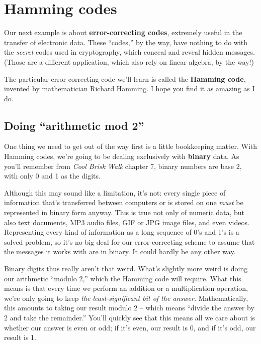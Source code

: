 \vfill

\pagebreak

\renewcommand{\thesubsection}{H\arabic{subsection}.}%
\section{Hamming codes}


Our next example is about \textbf{error-correcting codes}, extremely useful in
the transfer of electronic data. These ``codes,'' by the way, have nothing to
do with the \textit{secret} codes used in cryptography, which conceal and
reveal hidden messages. (Those are a different application, which also rely on
linear algebra, by the way!)

The particular error-correcting code we'll learn is called the \textbf{Hamming
code}, invented by mathematician Richard Hamming. I hope you find it as amazing
as I do.

\subsection{Doing ``arithmetic mod 2''}


One thing we need to get out of the way first is a little bookkeeping matter.
With Hamming codes, we're going to be dealing exclusively with \textbf{binary}
data. As you'll remember from \textit{Cool Brisk Walk} chapter 7, binary
numbers are base 2, with only 0 and 1 as the digits.


Although this may sound like a limitation, it's not: every single piece of
information that's transferred between computers or is stored on one
\textit{must} be represented in binary form anyway. This is true not only of
numeric data, but also text documents, MP3 audio files, GIF or JPG image files,
and even videos. Representing every kind of information as a long sequence of
0's and 1's is a solved problem, so it's no big deal for our error-correcting
scheme to assume that the messages it works with are in binary. It could hardly
be any other way.


Binary digits thus really aren't that weird. What's slightly more weird is
doing our arithmetic ``modulo 2,'' which the Hamming code will require. What
this means is that every time we perform an addition or a multiplication
operation, we're only going to keep \textit{the least-significant bit of the
answer.} Mathematically, this amounts to taking our result modulo 2 -- which
means ``divide the answer by 2 and take the remainder.'' You'll quickly see
that this means all we care about is whether our answer is even or odd; if it's
even, our result is 0, and if it's odd, our result is 1.

